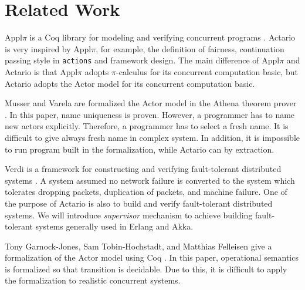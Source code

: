 \section{Related Work}
\label{sec:relatedwork}

Appl\(\pi\) is a Coq library for modeling and verifying concurrent programs \cite{Affeldt200817}.
Actario is very inspired by Appl\(\pi\), for example, the definition of fairness, continuation passing style in \texttt{actions} and framework design.
The main difference of Appl\(\pi\) and Actario is that Appl\(\pi\) adopts \(\pi\)-calculus for its concurrent computation basic, but Actario adopts the Actor model for its concurrent computation basic.

Musser and Varela are formalized the Actor model in the Athena theorem prover \cite{Athena}\cite{Musser:2013aa}. %
In this paper, name uniqueness is proven.
However, a programmer has to name new actors explicitly.
Therefore, a programmer has to select a fresh name. It is difficult to give always fresh name in complex system.
In addition, it is impossible to run program built in the formalization, while Actario can by extraction.

Verdi is a framework for constructing and verifying fault-tolerant distributed systems \cite{Verdi}.
A system assumed no network failure is converted to the system which tolerates dropping packets, duplication of packets, and machine failure.
One of the purpose of Actario is also to build and verify fault-tolerant distributed systems.
We will introduce \textit{supervisor} mechanism to achieve building fault-tolerant systems generally used in Erlang and Akka.


Tony Garnock-Jones, Sam Tobin-Hochstadt, and Matthias Felleisen give a formalization of the Actor model using Coq \cite{Garnock-Jones:2014aa}.
In this paper, operational semantics is formalized so that transition is decidable.
Due to this, it is difficult to apply the formalization to realistic concurrent systems.
